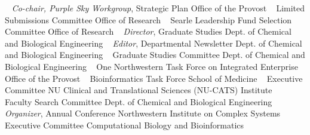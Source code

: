 ~
\Gap
{}
\textit{Co-chair, Purple Sky Workgroup}, Strategic Plan\newline
Office of the Provost \newline
~
\Gap
{}
Limited Submissions Committee\newline
Office of Research \newline
~
\Gap
{}
Searle Leadership Fund Selection Committee\newline
Office of Research \newline
~
\Gap
{}
\textit{Director}, Graduate Studies\newline
Dept. of Chemical and Biological Engineering \newline
~
\Gap
{}
\textit{Editor}, Departmental Newsletter \newline
Dept. of Chemical and Biological Engineering \newline
~
\Gap
{}
Graduate Studies Committee\newline
Dept. of Chemical and Biological Engineering \newline
~
\Gap
{}
One Northwestern Task Force on Integrated Enterprise\newline
Office of the Provost \newline
~
\Gap
{}
Bioinformatics Task Force\newline
School of Medicine \newline
~
\Gap
{}
Executive Committee\newline
NU Clinical and Translational Sciences (NU-CATS) Institute \newline
~
\Gap
{}
Faculty Search Committee\newline
Dept. of Chemical and Biological Engineering \newline
~
\Gap
{}
\textit{Organizer}, Annual Conference\newline
Northwestern Institute on Complex Systems \newline
~
\Gap
{}
Executive Committee\newline
Computational Biology and Bioinformatics \newline
